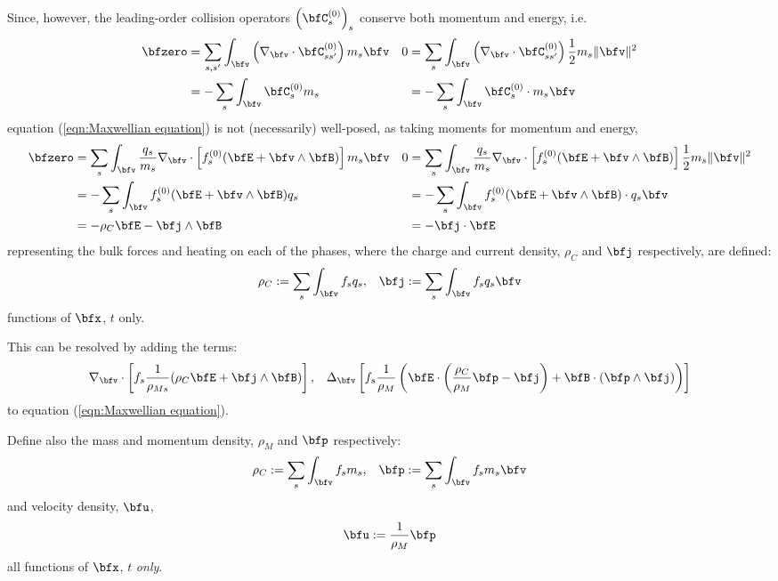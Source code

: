     Since, however, the leading-order collision operators $\left(\bfC_{s}^{(0)}\right)_{s}$ conserve both momentum and energy, i.e.
    \begin{align*}
        \bfzero  &=  \sum_{s, s'}\int_{\bfv}\left(\nabla_{\bfv}\cdot\bfC_{ss'}^{(0)}\right)m_{s}\bfv  &  0  &=  \sum_{s}\int_{\bfv}\left(\nabla_{\bfv}\cdot\bfC_{ss'}^{(0)}\right)\frac{1}{2}m_{s}\|\bfv\|^{2}  \\
        &=  - \sum_{s}\int_{\bfv}\bfC_{s}^{(0)}m_{s}  &  &=  - \sum_{s}\int_{\bfv}\bfC_{s}^{(0)}\cdot m_{s}\bfv
    \end{align*}
     equation (\ref{eqn:Maxwellian equation}) is not (necessarily) well-posed, as taking moments for momentum and energy,
    \begin{align*}
        \bfzero  &=  \sum_{s}\int_{\bfv}\frac{q_{s}}{m_{s}}\nabla_{\bfv}\cdot\left[f_{s}^{(0)}(\bfE + \bfv\wedge\bfB)\right]m_{s}\bfv  &  0  &=  \sum_{s}\int_{\bfv}\frac{q_{s}}{m_{s}}\nabla_{\bfv}\cdot\left[f_{s}^{(0)}(\bfE + \bfv\wedge\bfB)\right]\frac{1}{2}m_{s}\|\bfv\|^{2}  \\
        &=  - \sum_{s}\int_{\bfv}f_{s}^{(0)}(\bfE + \bfv\wedge\bfB)q_{s}  &  &=  - \sum_{s}\int_{\bfv}f_{s}^{(0)}(\bfE + \bfv\wedge\bfB)\cdot q_{s}\bfv  \\
        &=  - \rho_{C}\bfE - \bfj\wedge\bfB  &  &=  - \bfj\cdot\bfE
    \end{align*}
    representing the bulk forces and heating on each of the phases, where the charge and current density, $\rho_{C}$ and $\bfj$ respectively, are defined:
    \begin{align}
        \rho_{C}  :=  \sum_{s}\int_{\bfv}f_{s}q_{s},  &&
        \bfj      :=  \sum_{s}\int_{\bfv}f_{s}q_{s}\bfv
    \end{align}
    functions of $\bfx$, $t$ only.
    
    This can be resolved by adding the terms:
    \begin{align}
        \nabla_{\bfv}\cdot\left[f_{s}\frac{1}{\rho_{Ms}}(\rho_{C}\bfE + \bfj\wedge\bfB)\right],  &&
        \Delta_{\bfv}\left[f_{s}\frac{1}{\rho_{M}}\left(\bfE\cdot\left(\frac{\rho_{C}}{\rho_{M}}\bfp - \bfj\right) + \bfB\cdot(\bfp\wedge\bfj)\right)\right]
    \end{align}
    to equation (\ref{eqn:Maxwellian equation}).
    
    Define also the mass and momentum density, $\rho_{M}$ and $\bfp$ respectively:
    \begin{align}
        \rho_{C}  :=  \sum_{s}\int_{\bfv}f_{s}m_{s},  &&
        \bfp      :=  \sum_{s}\int_{\bfv}f_{s}m_{s}\bfv
    \end{align}
    and velocity density, $\bfu$,
    \begin{equation}
        \bfu  :=  \frac{1}{\rho_{M}}\bfp
    \end{equation}
    all functions of $\bfx$, $t$ \emph{only}.
    
